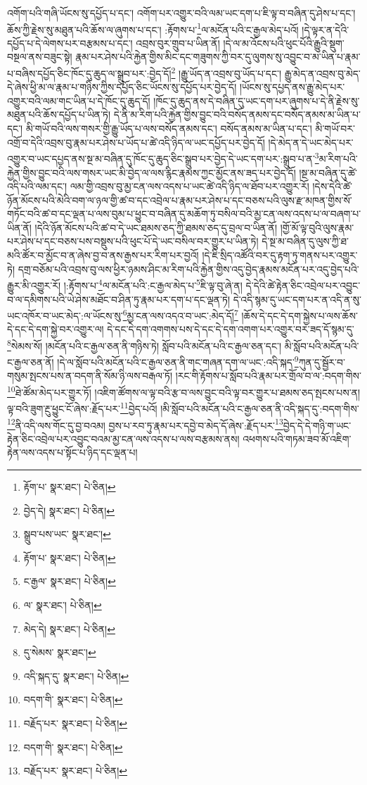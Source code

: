 འགོག་པའི་གཞི་ཡོངས་སུ་དཔྱོད་པ་དང་། འགོག་པར་འགྱུར་བའི་ལམ་ཡང་དག་པ་ཇི་ལྟ་བ་བཞིན་དུ་ཤེས་པ་དང་། ཆོས་ཀྱི་རྗེས་སུ་མཐུན་པའི་ཆོས་ལ་ཞུགས་པ་དང་། :རྟོགས་པ་\footnote{རྟོག་པ་  སྣར་ཐང་།  པེ་ཅིན། }ལ་མངོན་པའི་ང་རྒྱལ་མེད་པའོ། །དེ་ལྟར་ན་དེའི་དཔྱོད་པ་དེ་ལེགས་པར་བརྩམས་པ་དང་། འབྲས་བུར་གྲུབ་པ་ཡིན་ནོ། །དེ་ལ་མ་འོངས་པའི་ཕུང་པོའི་རྒྱུའི་སྡུག་བསྔལ་ནས་བཟུང་སྟེ། རྣམ་པར་ཤེས་པའི་རྐྱེན་གྱིས་མིང་དང་གཟུགས་ཀྱི་བར་དུ་ལུགས་སུ་འབྱུང་བ་མ་ཡིན་པ་རྣམ་པ་བཞིས་དཔྱོད་ཅིང་ཁོང་དུ་ཆུད་ལ་སྒྲུབ་པར་:བྱེད་དོ།\footnote{བྱེད་དེ།  སྣར་ཐང་།  པེ་ཅིན། } །རྒྱུ་ཡོད་ན་འབྲས་བུ་ཡོད་པ་དང་། རྒྱུ་མེད་ན་འབྲས་བུ་མེད་དེ་ཞེས་ཕྱི་མ་ལ་རྣམ་པ་གཉིས་ཀྱིས་དཔྱོད་ཅིང་ཡོངས་སུ་དཔྱོད་པར་བྱེད་དོ། །ཡོངས་སུ་དཔྱད་ནས་རྒྱུ་མེད་པར་འགྱུར་བའི་ལམ་གང་ཡིན་པ་དེ་ཁོང་དུ་ཆུད་དོ། །ཁོང་དུ་ཆུད་ནས་དེ་བཞིན་དུ་ཡང་དག་པར་ཞུགས་པ་དེ་ནི་རྗེས་སུ་མཐུན་པའི་ཆོས་དཔྱོད་པ་ཡིན་ཏེ། དེ་ནི་མ་རིག་པའི་རྐྱེན་གྱིས་བྱུང་བའི་བསོད་ནམས་དང་བསོད་ནམས་མ་ཡིན་པ་དང་། མི་གཡོ་བའི་ལས་གསར་གྱི་རྒྱུ་ཡོད་པ་ལས་བསོད་ནམས་དང་། བསོད་ནམས་མ་ཡིན་པ་དང་། མི་གཡོ་བར་འགྲོ་བ་དེའི་འབྲས་བུ་རྣམ་པར་ཤེས་པ་ཡོད་པ་ཚེ་འདི་ཉིད་ལ་ཡང་དཔྱོད་པར་བྱེད་དོ། །དེ་མེད་ན་དེ་ཡང་མེད་པར་འགྱུར་བ་ཡང་དཔྱད་ནས་སྔ་མ་བཞིན་དུ་ཁོང་དུ་ཆུད་ཅིང་སྒྲུབ་པར་བྱེད་དེ་ཡང་དག་པར་:སྒྲུབ་པ་ན་\footnote{སྒྲུབ་པས་ཡང་  སྣར་ཐང་། }མ་རིག་པའི་རྐྱེན་གྱིས་བྱུང་བའི་ལས་གསར་ཡང་མི་བྱེད་ལ་ལས་རྙིང་རྣམས་ཀྱང་མྱོང་ནས་ཟད་པར་བྱེད་དོ། །སྔ་མ་བཞིན་དུ་ཚེ་འདི་པའི་ལམ་དང་། ལམ་གྱི་འབྲས་བུ་མྱ་ངན་ལས་འདས་པ་ཡང་ཚེ་འདི་ཉིད་ལ་ཐོབ་པར་འགྱུར་རོ། །དེས་དེའི་ཚེ་ཉོན་མོངས་པའི་མེའི་བག་ལ་ཉལ་གྱི་ཚ་བ་དང་འབྲེལ་པ་རྣམ་པར་ཤེས་པ་དང་བཅས་པའི་ལུས་རྫ་མཁན་གྱིས་སོ་གཏོང་བའི་ཚ་བ་དང་ལྡན་པ་ལས་བུམ་པ་ཕྱུང་བ་བཞིན་དུ་མཆོག་ཏུ་བསིལ་བའི་མྱ་ངན་ལས་འདས་པ་ལ་བཞག་པ་ཡིན་ནོ། །དེའི་ཉོན་མོངས་པའི་ཚ་བ་དེ་ཡང་ཐམས་ཅད་ཀྱི་ཐམས་ཅད་དུ་བྲལ་བ་ཡིན་ནོ། །གྱོ་མོ་ལྟ་བུའི་ལུས་རྣམ་པར་ཤེས་པ་དང་བཅས་པས་བསྡུས་པའི་ཕུང་པོ་དེ་ཡང་བསིལ་བར་གྱུར་པ་ཡིན་ཏེ། དེ་སྔ་མ་བཞིན་དུ་ལུས་ཀྱི་ཐ་མའི་ཚོར་བ་མྱོང་བ་ན་ཞེས་བྱ་བ་ནས་རྒྱས་པར་རིག་པར་བྱའོ། །དེ་ཇི་སྲིད་འཚོའི་བར་དུ་རྟག་ཏུ་གནས་པར་འགྱུར་ཏེ། དགྲ་བཅོམ་པའི་འབྲས་བུ་ལས་ཕྱིར་ཉམས་ཤིང་མ་རིག་པའི་རྐྱེན་གྱིས་འདུ་བྱེད་རྣམས་མངོན་པར་འདུ་བྱེད་པའི་རྒྱུར་མི་འགྱུར་རོ། །:རྟོགས་པ་\footnote{རྟོག་པ་  སྣར་ཐང་།  པེ་ཅིན། }ལ་མངོན་པའི་:ང་རྒྱལ་མེད་པ་\footnote{ང་རྒྱལ་  སྣར་ཐང་།  པེ་ཅིན། }ཇི་ལྟ་བུ་ཞེ་ན། དེ་དེའི་ཚེ་རྟེན་ཅིང་འབྲེལ་པར་འབྱུང་བ་ལ་དམིགས་པའི་ཡེ་ཤེས་མཐོང་བ་ཤིན་ཏུ་རྣམ་པར་དག་པ་དང་ལྡན་ཏེ། དེ་འདི་སྙམ་དུ་ཡང་དག་པར་ན་འདི་ན་སུ་ཡང་འཁོར་བ་ཡང་མེད་:ལ་ཡོངས་སུ་\footnote{ལ་  སྣར་ཐང་།  པེ་ཅིན། }མྱ་ངན་ལས་འདའ་བ་ཡང་:མེད་དོ།\footnote{མེད་དེ།  སྣར་ཐང་།  པེ་ཅིན། } །ཆོས་དེ་དང་དེ་དག་སྐྱེས་པ་ལས་ཆོས་དེ་དང་དེ་དག་སྐྱེ་བར་འགྱུར་ལ། དེ་དང་དེ་དག་འགགས་པས་དེ་དང་དེ་དག་འགག་པར་འགྱུར་བར་ཟད་དོ་སྙམ་དུ་\footnote{དུ་སེམས་  སྣར་ཐང་། }སེམས་སོ། །མངོན་པའི་ང་རྒྱལ་ཅན་ནི་གཉིས་ཏེ། སློབ་པའི་མངོན་པའི་ང་རྒྱལ་ཅན་དང་། མི་སློབ་པའི་མངོན་པའི་ང་རྒྱལ་ཅན་ནོ། །དེ་ལ་སློབ་པའི་མངོན་པའི་ང་རྒྱལ་ཅན་ནི་གང་གཞན་དག་ལ་ཡང་:འདི་སྐད་\footnote{འདི་སྐད་དུ་  སྣར་ཐང་།  པེ་ཅིན། }ཀུན་དུ་སྦྱོར་བ་གསུམ་སྤངས་པས་ན་བདག་ནི་སོམ་ཉི་ལས་བརྒལ་ཏོ། །རང་གི་རྟོགས་པ་སློབ་པའི་རྣམ་པར་གྲོལ་བ་ལ་:བདག་གིས་\footnote{བདག་གི་  སྣར་ཐང་།  པེ་ཅིན། }ཐེ་ཚོམ་མེད་པར་གྱུར་ཏོ། །འཇིག་ཚོགས་ལ་ལྟ་བའི་རྩ་བ་ལས་བྱུང་བའི་ལྟ་བར་གྱུར་པ་ཐམས་ཅད་སྤངས་པས་ན། ལྟ་བའི་ཟུག་རྔུ་ཕྱུང་ངོ་ཞེས་:རྗོད་པར་\footnote{བརྗོད་པར་  སྣར་ཐང་།  པེ་ཅིན། }བྱེད་པའོ། །མི་སློབ་པའི་མངོན་པའི་ང་རྒྱལ་ཅན་ནི་འདི་སྐད་དུ་:བདག་གིས་\footnote{བདག་གི་  སྣར་ཐང་།  པེ་ཅིན། }ནི་འདི་ལས་གོང་དུ་བྱ་བའམ། བྱས་པ་རབ་ཏུ་རྣམ་པར་དབྱེ་བ་མེད་དོ་ཞེས་:རྗོད་པར་\footnote{བརྗོད་པར་  སྣར་ཐང་།  པེ་ཅིན། }བྱེད་དེ་དེ་གཉི་ག་ཡང་རྟེན་ཅིང་འབྲེལ་པར་འབྱུང་བའམ་མྱ་ངན་ལས་འདས་པ་ལས་བརྩམས་ནས། འཕགས་པའི་གཏམ་ཟབ་མོ་འཇིག་རྟེན་ལས་འདས་པ་སྟོང་པ་ཉིད་དང་ལྡན་པ། 